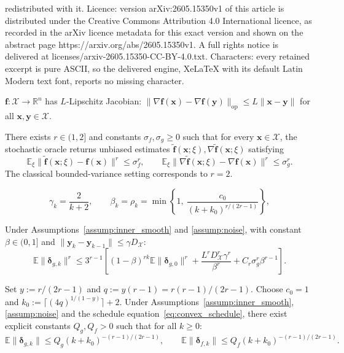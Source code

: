 \documentclass[10pt,a4paper]{amsart}
\def\eqref#1{equation~\ref{#1}}
\def\vf{{\bm{f}}}
\def\vx{{\bm{x}}}
\def\vy{{\bm{y}}}
\newcommand{\E}{\mathbb{E}}
\newcommand{\R}{\mathbb{R}}
\newcommand{\cX}{\mathcal{X}}
\begin{document}
redistributed with it. Licence: version arXiv:2605.15350v1 of this article is distributed under the Creative Commons Attribution 4.0 International licence, as recorded in the arXiv licence metadata for this exact version and shown on the abstract page https://arxiv.org/abs/2605.15350v1. A full rights notice is delivered at licenses/arxiv-2605.15350-CC-BY-4.0.txt. Characters: every retained excerpt is pure ASCII, so the delivered engine, XeLaTeX with its default Latin Modern text font, reports no missing character.
\begin{assumption} \label{assump:inner_smooth}
$\vf : \cX \to \R^n$ has $L$-Lipschitz Jacobian: $\|\nabla \vf(\vx) - \nabla \vf(\vy)\|_{\mathrm{op}} \le L \|\vx - \vy\|$ for all $\vx, \vy \in \cX$.
\end{assumption}

\begin{assumption} \label{assump:noise}
There exists $r \in (1, 2]$ and constants $\sigma_f, \sigma_g \ge 0$ such that for every $\vx \in \cX$, the stochastic oracle returns unbiased estimates $\tilde\vf(\vx; \xi), \nabla\tilde\vf(\vx; \xi)$ satisfying
\[
\E_\xi\|\tilde\vf(\vx; \xi) - \vf(\vx)\|^r \le \sigma_f^r,
\qquad
\E_\xi\|\nabla \tilde\vf(\vx; \xi) - \nabla \vf(\vx)\|^r \le \sigma_g^r.
\]
The classical bounded-variance setting corresponds to $r = 2$.
\end{assumption}

\begin{equation}\label{eq:convex_schedule}
\gamma_k = \frac{2}{k+2}, \qquad \beta_k = \rho_k = \min\!\left\{1,\ \frac{c_0}{(k+k_0)^{r/(2r-1)}}\right\},
\end{equation}

\begin{lemma} \label{lem:grad_tracker_main}
Under Assumptions~\ref{assump:inner_smooth} and \ref{assump:noise}, with constant $\beta \in (0,1]$ and $\|\vy_k - \vy_{k-1}\| \le \gamma D_{\cX}$:
\[
\E\|\bm{\delta}_{g,k}\|^r \le 3^{r-1}\!\left[(1-\beta)^{rk} \E\|\bm{\delta}_{g,0}\|^r + \frac{L^r D_{\cX}^r \gamma^r}{\beta^r} + C_r \sigma_g^r \beta^{r-1}\right].
\]
\end{lemma}

\begin{lemma} \label{lem:convex_tracking}
Set $y := r/(2r-1)$ and $q := y(r-1) = r(r-1)/(2r-1)$. Choose $c_0 = 1$ and $k_0 := \lceil (4q)^{1/(1-y)}\rceil + 2$. Under Assumptions~\ref{assump:inner_smooth}, \ref{assump:noise} and the schedule \eqref{eq:convex_schedule}, there exist explicit constants $Q_g, Q_f > 0$ such that for all $k \ge 0$:
\[
\E\|\bm\delta_{g,k}\| \le Q_g (k+k_0)^{-(r-1)/(2r-1)}, \qquad \E\|\bm\delta_{f,k}\| \le Q_f (k+k_0)^{-(r-1)/(2r-1)}.
\]
\end{lemma}
\end{document}
